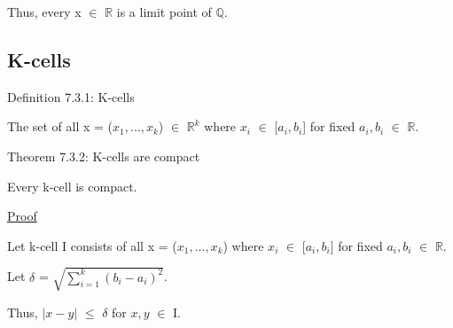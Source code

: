 	Thus, every x $\in$ $\mathbb{R}$ is a limit point of $\mathbb{Q}$.





\subsection{ K-cells } 

{ \color{blue} Definition 7.3.1: K-cells } 

	\begin{adjustbox}{minipage=14cm, right, vspace=0.1cm 0cm}
		The set of all x = ($x_1, ... , x_k$) $\in$ $\mathbb{R}^k$
		where $x_i$ $\in$ [$a_i,b_i$] for fixed $a_i,b_i$ $\in$ $\mathbb{R}$.
	\end{adjustbox}

{ \color{red} Theorem 7.3.2: K-cells are compact } 

	\begin{adjustbox}{minipage=14cm, right, vspace=0.1cm 0cm}
		Every k-cell is compact.
	\end{adjustbox}

{ \color{magenta} \underline{Proof} } 

	Let k-cell I consists of all x = ($x_1, ... , x_k$) where
	$x_i$ $\in$ [$a_i,b_i$] for fixed $a_i,b_i$ $\in$ $\mathbb{R}$.

	Let $\delta$ = $\sqrt{\sum_{i=1}^{k} (b_i - a_i)^2}$.

	Thus, $|x-y|$ $\leq$ $\delta$ for $x,y$ $\in$ I.
























